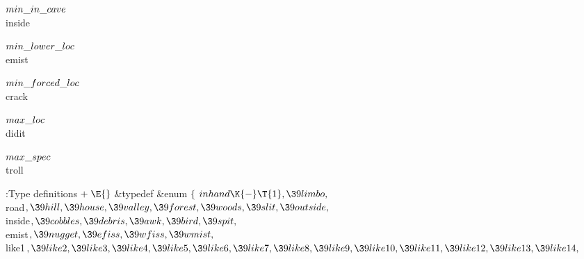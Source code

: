 \Y\B\4\D$\\{min\_in\_cave}$ \5
\\{inside}\par
\B\4\D$\\{min\_lower\_loc}$ \5
\\{emist}\par
\B\4\D$\\{min\_forced\_loc}$ \5
\\{crack}\par
\B\4\D$\\{max\_loc}$ \5
\\{didit}\par
\B\4\D$\\{max\_spec}$ \5
\\{troll}\par
\Y\B\4:Type definitions\X${}\mathrel+\E{}$\6
\&{typedef} \&{enum} ${}\{{}$\1\6
${}\\{inhand}\K{-}\T{1},\39\\{limbo},{}$\6
\\{road}${},\39\\{hill},\39\\{house},\39\\{valley},\39\\{forest},\39\\{woods},\39\\{slit},\39\\{outside},{}$\6
\\{inside}${},\39\\{cobbles},\39\\{debris},\39\\{awk},\39\\{bird},\39\\{spit},{}$\6
\\{emist}${},\39\\{nugget},\39\\{efiss},\39\\{wfiss},\39\\{wmist},{}$\6
\\{like1}${},\39\\{like2},\39\\{like3},\39\\{like4},\39\\{like5},\39\\{like6},\39\\{like7},\39\\{like8},\39\\{like9},\39\\{like10},\39\\{like11},\39\\{like12},\39\\{like13},\39\\{like14},{}$\6
